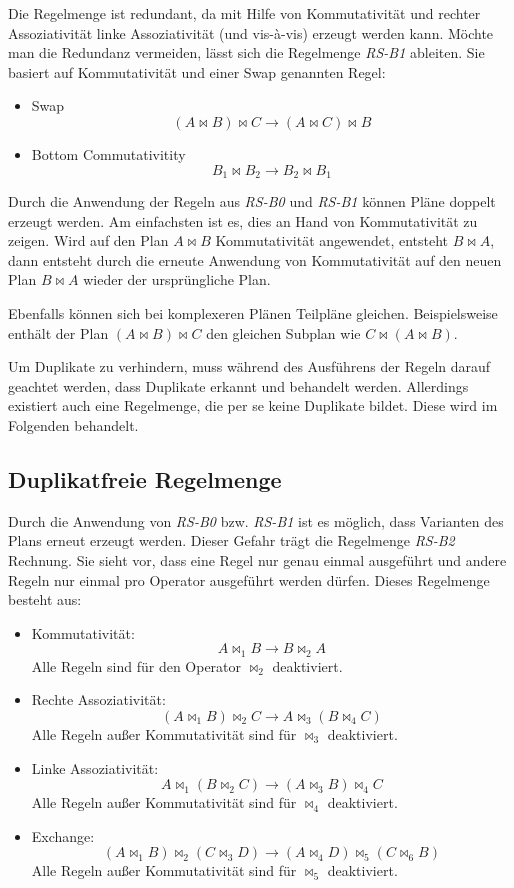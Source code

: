 Die Regelmenge ist redundant, da mit Hilfe von Kommutativität und rechter Assoziativität linke Assoziativität (und vis-à-vis) erzeugt werden kann. Möchte man die Redundanz vermeiden, lässt sich die Regelmenge \textit{RS-B1} ableiten. Sie basiert auf Kommutativität und einer Swap genannten Regel:

\begin{itemize}
\item Swap $$ (A \Join B) \Join C \to (A \Join C) \Join B $$
\item Bottom Commutativitity $$ B_1 \Join B_2 \to B_2 \Join B_1$$
\end{itemize}



Durch die Anwendung der Regeln aus \textit{RS-B0} und \textit{RS-B1} können Pläne doppelt erzeugt werden. Am einfachsten ist es, dies an Hand von Kommutativität zu zeigen. Wird auf den Plan $A \Join B$ Kommutativität angewendet, entsteht $B \Join A$, dann entsteht durch die erneute Anwendung von Kommutativität auf den neuen Plan $B \Join A$ wieder der ursprüngliche Plan.

Ebenfalls können sich bei komplexeren Plänen  Teilpläne gleichen. Beispielsweise enthält der Plan $(A \Join B) \Join C$ den gleichen Subplan wie $C \Join (A \Join B)$.

Um Duplikate zu verhindern, muss während des Ausführens der Regeln darauf geachtet werden, dass Duplikate erkannt und behandelt werden. Allerdings existiert auch eine Regelmenge, die per se keine Duplikate bildet. Diese wird im Folgenden behandelt.



\subsection{Duplikatfreie Regelmenge}
Durch die Anwendung von \textit{RS-B0} bzw. \textit{RS-B1} ist es möglich, dass Varianten des Plans erneut erzeugt werden. Dieser Gefahr trägt die Regelmenge \textit{RS-B2} Rechnung. Sie sieht vor, dass eine Regel nur genau einmal ausgeführt und andere Regeln nur einmal pro Operator ausgeführt werden dürfen. Dieses Regelmenge besteht aus:


\begin{itemize}
\item Kommutativität: $$ A \Join_1 B \to B \Join_2 A$$
Alle Regeln sind für den Operator $\Join_2$ deaktiviert.
\item Rechte Assoziativität: $$(A \Join_1 B) \Join_2 C \to A \Join_3 (B \Join_4 C) $$
Alle Regeln außer Kommutativität sind für $\Join_3$ deaktiviert.
\item Linke Assoziativität: $$A \Join_1 (B \Join_2 C) \to (A \Join_3 B) \Join_4 C$$
Alle Regeln außer Kommutativität sind für $\Join_4$ deaktiviert.

\item Exchange: $$(A \Join_1 B) \Join_2 (C \Join_3 D) \to (A \Join_4 D) \Join_5 (C \Join_6 B) $$
Alle Regeln außer Kommutativität sind für $\Join_5$ deaktiviert.
\end{itemize}

